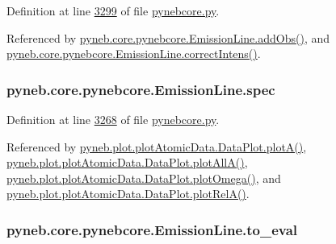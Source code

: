Definition at line \hyperlink{pynebcore_8py_source_l03299}{3299} of file \hyperlink{pynebcore_8py_source}{pynebcore.\+py}.



Referenced by \hyperlink{pynebcore_8py_source_l03347}{pyneb.\+core.\+pynebcore.\+Emission\+Line.\+add\+Obs()}, and \hyperlink{pynebcore_8py_source_l03325}{pyneb.\+core.\+pynebcore.\+Emission\+Line.\+correct\+Intens()}.

\hypertarget{classpyneb_1_1core_1_1pynebcore_1_1_emission_line_a6de8a145c1cb80aff621c95dc4caabe1}{}
\subsubsection[{spec}]{\setlength{\rightskip}{0pt plus 5cm}pyneb.\+core.\+pynebcore.\+Emission\+Line.\+spec}\label{classpyneb_1_1core_1_1pynebcore_1_1_emission_line_a6de8a145c1cb80aff621c95dc4caabe1}


Definition at line \hyperlink{pynebcore_8py_source_l03268}{3268} of file \hyperlink{pynebcore_8py_source}{pynebcore.\+py}.



Referenced by \hyperlink{plot_atomic_data_8py_source_l00116}{pyneb.\+plot.\+plot\+Atomic\+Data.\+Data\+Plot.\+plot\+A()}, \hyperlink{plot_atomic_data_8py_source_l00188}{pyneb.\+plot.\+plot\+Atomic\+Data.\+Data\+Plot.\+plot\+All\+A()}, \hyperlink{plot_atomic_data_8py_source_l00372}{pyneb.\+plot.\+plot\+Atomic\+Data.\+Data\+Plot.\+plot\+Omega()}, and \hyperlink{plot_atomic_data_8py_source_l00261}{pyneb.\+plot.\+plot\+Atomic\+Data.\+Data\+Plot.\+plot\+Rel\+A()}.

\hypertarget{classpyneb_1_1core_1_1pynebcore_1_1_emission_line_a8b0ab342a873f8ace6c69ed093da5cfa}{}
\subsubsection[{to\+\_\+eval}]{\setlength{\rightskip}{0pt plus 5cm}pyneb.\+core.\+pynebcore.\+Emission\+Line.\+to\+\_\+eval}\label{classpyneb_1_1core_1_1pynebcore_1_1_emission_line_a8b0ab342a873f8ace6c69ed093da5cfa}


